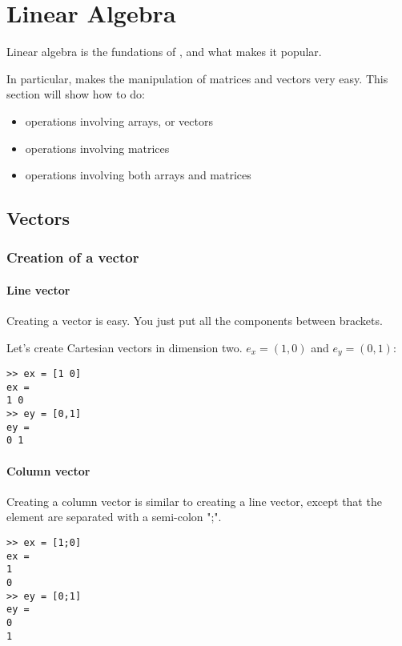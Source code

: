 \chapter{Linear Algebra}

Linear algebra is the fundations of \matlab, and what makes it popular.

In particular, \matlab makes the manipulation of matrices and vectors very easy.
This section will show how to do:
\begin{itemize}
	\item operations involving arrays, or vectors
	\item operations involving matrices
	\item operations involving both arrays and matrices
\end{itemize}


\section{Vectors}
\subsection{Creation of a vector}
\subsubsection{Line vector}
Creating a vector is easy. You just put all the components between brackets.

Let's create Cartesian vectors in dimension two. $e_x = (1,0)$ and $e_y = (0,1)$:


\begin{lstlisting}
>> ex = [1 0]
ex =
1 0
>> ey = [0,1]
ey =
0 1
\end{lstlisting}
 

\subsubsection{Column vector}
Creating a column vector is similar to creating a line vector, except that the element are separated with a semi-colon ";".


\begin{lstlisting}
>> ex = [1;0]
ex =
1
0
>> ey = [0;1]
ey =
0
1
\end{lstlisting}

